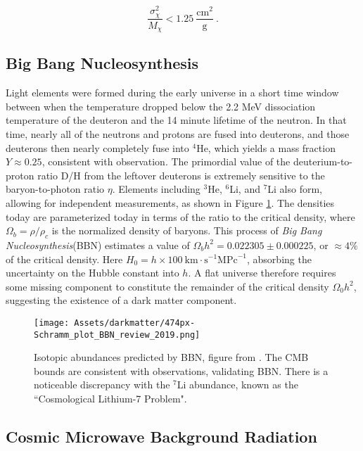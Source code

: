 \begin{equation}
    \frac{\sigma^2_\chi }{ M_\chi} < 1.25~\frac{\mathrm{cm}^2}{\mathrm g} ~.
\end{equation}

\subsection{Big Bang Nucleosynthesis}

Light elements were formed during the early universe in a short time window between when the temperature dropped below the 2.2 MeV dissociation temperature of the deuteron and the 14 minute lifetime of the neutron.
In that time, nearly all of the neutrons and protons are fused into deuterons, and those deuterons then nearly completely fuse into $^4$He, which yields a mass fraction $Y\approx 0.25$, consistent with observation.
The primordial value of the deuterium-to-proton ratio D/H from the leftover deuterons is  extremely sensitive to the baryon-to-photon ratio $\eta$.
Elements including $^3$He, $^6$Li, and $^7$Li  also form, allowing for independent measurements, as shown in Figure \ref{fig:bbn}.
The densities today are parameterized today in terms of the ratio to the critical density, where $\Omega_b = \rho / \rho_c$ is the normalized density of baryons.
 This process of \textit{Big Bang Nucleosynthesis}\cite{cyburt_big_2016}(BBN) estimates a value of $\Omega_b h^2 = 0.022305 \pm 0.000225$, or $\approx 4\%$ of the critical density.
 Here $H_0 = h \times 100\mathrm{~km}\cdot \mathrm{s}^{-1} \mathrm{MPc}^{-1}$, absorbing the uncertainty on the Hubble constant into $h$.
 A flat universe therefore requires some missing component to constitute the remainder of the critical density $\Omega_0 h^2$, suggesting the existence of a dark matter component.
 
 \begin{figure}
     \centering
     \texttt{[image: Assets/darkmatter/474px-Schramm\_plot\_BBN\_review\_2019.png]}
     \caption[Isotopic abundances predicted by Big Bang Nucleosynthesis.]%
     {Isotopic abundances predicted by BBN, figure from \cite{fields_big-bang_2014}.
    The CMB bounds are consistent with observations, validating BBN.
    There is a noticeable discrepancy with the $^7$Li abundance, known as the ``Cosmological Lithium-7 Problem"\cite{bertulani_big_2022}.
    }
     \label{fig:bbn}
 \end{figure}
\subsection{Cosmic Microwave Background Radiation}
